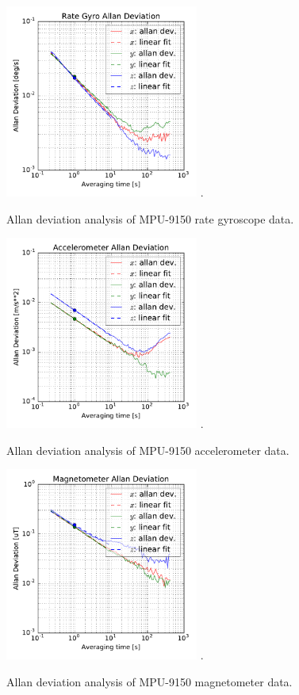 \documentclass[conference]{IEEEtran}
\begin{document}
\begin{figure}[!t]
  \centering
  \includegraphics[width=2.5in]{figures/gyro_data_allan.pdf}
  \DeclareGraphicsExtensions.
  \caption{Allan deviation analysis of MPU-9150 rate gyroscope data.}
  \label{gyro_data_allan}
\end{figure}

\begin{figure}[!t]
  \centering
  \includegraphics[width=2.5in]{figures/accel_data_allan.pdf}
  \DeclareGraphicsExtensions.
  \caption{Allan deviation analysis of MPU-9150 accelerometer data.}
  \label{accel_data_allan}
\end{figure}

\begin{figure}[!t]
  \centering
  \includegraphics[width=2.5in]{figures/mag_data_allan.pdf}
  \DeclareGraphicsExtensions.
  \caption{Allan deviation analysis of MPU-9150 magnetometer data.}
  \label{mag_data_allan}
\end{figure}
\end{document}

